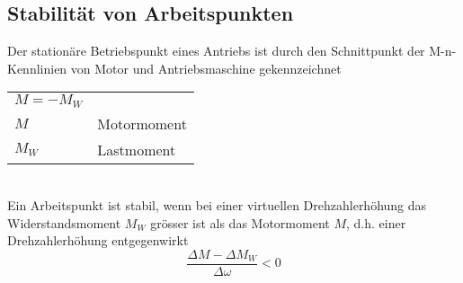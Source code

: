 \subsection{Stabilität von Arbeitspunkten}
Der stationäre Betriebspunkt eines Antriebs ist durch den Schnittpunkt der
M-n-Kennlinien von Motor und Antriebsmaschine gekennzeichnet\\
\begin{tabular}{ll}
$M=-M_W$\\
$M$ & Motormoment\\
$M_W$ & Lastmoment\\
\end{tabular}\\
Ein Arbeitspunkt ist stabil, wenn bei einer virtuellen Drehzahlerhöhung das
Widerstandsmoment $M_W$ grösser ist als das Motormoment $M$, d.h. einer
Drehzahlerhöhung entgegenwirkt\\
$$\frac{\Delta M- \Delta M_W}{\Delta \omega}<0$$\\
